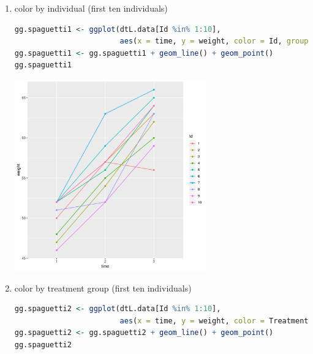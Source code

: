 \documentclass{article}
\begin{document}
\begin{enumerate}
\item color by individual (first ten individuals)
\label{sec:org81ef669}

\begin{lstlisting}[language=r,numbers=none]
gg.spaguetti1 <- ggplot(dtL.data[Id %in% 1:10], 
                        aes(x = time, y = weight, color = Id, group = Id))
gg.spaguetti1 <- gg.spaguetti1 + geom_line() + geom_point()
gg.spaguetti1
\end{lstlisting}

\begin{center}
\includegraphics[width=0.65\textwidth]{./figures/fig-spaguetti1.pdf}
\end{center}


\clearpage
\item color by treatment group (first ten individuals)
\label{sec:org1f69796}

\begin{lstlisting}[language=r,numbers=none]
gg.spaguetti2 <- ggplot(dtL.data[Id %in% 1:10],
                        aes(x = time, y = weight, color = Treatment, group = Id))
gg.spaguetti2 <- gg.spaguetti2 + geom_line() + geom_point()
gg.spaguetti2
\end{lstlisting}


\end{enumerate}
\end{document}
